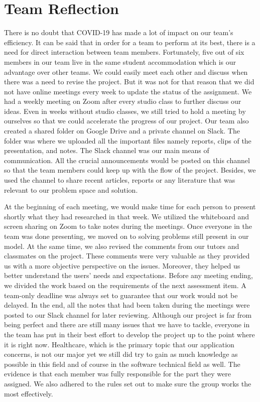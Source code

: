 \section{Team Reflection}
  \par There is no doubt that COVID-19 has made a lot of impact on our team's efficiency. It can be said that in order for a team to perform at its best, there is a need for direct interaction between team members. Fortunately, five out of six members in our team live in the same student accommodation which is our advantage over other teams. We could easily meet each other and discuss when there was a need to revise the project. But it was not for that reason that we did not have online meetings every week to update the status of the assignment. We had a weekly meeting on Zoom after every studio class to further discuss our ideas. Even in weeks without studio classes, we still tried to hold a meeting by ourselves so that we could accelerate the progress of our project. Our team also created a shared folder on Google Drive and a private channel on Slack. The folder was where we uploaded all the important files namely reports, clips of the presentation, and notes. The Slack channel was our main means of communication. All the crucial announcements would be posted on this channel so that the team members could keep up with the flow of the project. Besides, we used the channel to share recent articles, reports or any literature that was relevant to our problem space and solution. 
  \par At the beginning of each meeting, we would make time for each person to present shortly what they had researched in that week. We utilized the whiteboard and screen sharing on Zoom to take notes during the meetings. Once everyone in the team was done presenting, we moved on to solving problems still present in our model. At the same time, we also revised the comments from our tutors and classmates on the project. These comments were very valuable as they provided us with a more objective perspective on the issues. Moreover, they helped us better understand the users’ needs and expectations. Before any meeting ending, we divided the work based on the requirements of the next assessment item. A team-only deadline was always set to guarantee that our work would not be delayed. In the end, all the notes that had been taken during the meetings were posted to our Slack channel for later reviewing. Although our project is far from being perfect and there are still many issues that we have to tackle, everyone in the team has put in their best effort to develop the project up to the point where it is right now. Healthcare, which is the primary topic that our application concerns, is not our major yet we still did try to gain as much knowledge as possible in this field and of course in the software technical field as well. The evidence is that each member was fully responsible for the part they were assigned. We also adhered to the rules set out to make sure the group works the most effectively.
